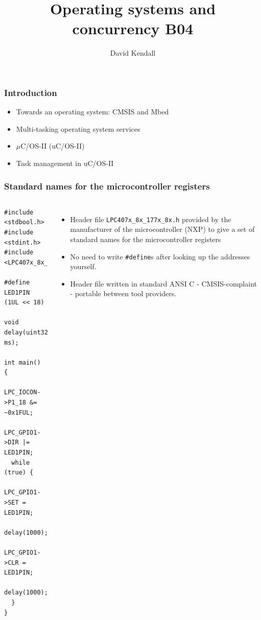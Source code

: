 \documentclass[hyperref={pdfpagelabels=false},svgnames]{beamer}
\title{Operating systems and concurrency B04}
\subtitle{}
\author{David Kendall}
\institute{Northumbria University}
\date{}
\begin{document}
\begin{frame}
\titlepage
\end{frame}

\begin{frame}
\frametitle{Introduction}
\begin{itemize}
\item Towards an operating system: CMSIS and Mbed
\item Multi-tasking operating system services
\item $\mu$C/OS-II (uC/OS-II) 
\item Task management in uC/OS-II
\end{itemize}
\end{frame}

\begin{frame}[shrink=10, fragile]
\frametitle{Standard names for the microcontroller registers}
\begin{columns}
\begin{lstlisting}
#include <stdbool.h>
#include <stdint.h>
#include <LPC407x_8x_177x_8x.h>

#define LED1PIN    (1UL << 18)

void delay(uint32_t ms);

int main() {
  LPC_IOCON->P1_18 &= ~0x1FUL;
  LPC_GPIO1->DIR |= LED1PIN;
  while (true) {
    LPC_GPIO1->SET = LED1PIN;
    delay(1000);
    LPC_GPIO1->CLR = LED1PIN;
    delay(1000);
  }
}
\end{lstlisting}
\begin{itemize}
\item Header file \verb'LPC407x_8x_177x_8x.h' provided by the 
manufacturer of the microcontroller (NXP) to give a set of
\alert{standard names} for the microcontroller registers
\item No need to write \verb'#define's after looking up the
addresses yourself.
\item Header file written in standard ANSI C - CMSIS-complaint -
  portable between tool providers.
\end{itemize}
\end{columns}
\end{frame}
 
\end{document}
